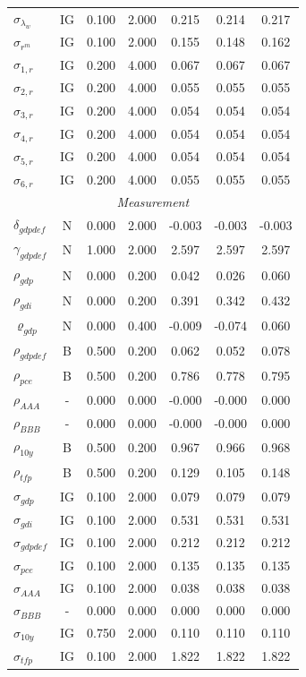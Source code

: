 \documentclass[12pt]{article}
\begin{document}
{\begin{longtable}{lcccccc}
$\sigma_{\lambda_w}$ & IG &    0.100 &    2.000 &    0.215 &    0.214 &    0.217 \\
$\sigma_{r^m}$ & IG &    0.100 &    2.000 &    0.155 &    0.148 &    0.162 \\
$\sigma_{1,r}$ & IG &    0.200 &    4.000 &    0.067 &    0.067 &    0.067 \\
$\sigma_{2,r}$ & IG &    0.200 &    4.000 &    0.055 &    0.055 &    0.055 \\
$\sigma_{3,r}$ & IG &    0.200 &    4.000 &    0.054 &    0.054 &    0.054 \\
$\sigma_{4,r}$ & IG &    0.200 &    4.000 &    0.054 &    0.054 &    0.054 \\
$\sigma_{5,r}$ & IG &    0.200 &    4.000 &    0.054 &    0.054 &    0.054 \\
$\sigma_{6,r}$ & IG &    0.200 &    4.000 &    0.055 &    0.055 &    0.055 \\
\multicolumn{7}{c}{\textit{Measurement}} \\[3pt]
$\delta_{gdpdef}$ & N &    0.000 &    2.000 &   -0.003 &   -0.003 &   -0.003 \\
$\gamma_{gdpdef}$ & N &    1.000 &    2.000 &    2.597 &    2.597 &    2.597 \\
$\rho_{gdp}$ & N &    0.000 &    0.200 &    0.042 &    0.026 &    0.060 \\
$\rho_{gdi}$ & N &    0.000 &    0.200 &    0.391 &    0.342 &    0.432 \\
$\varrho_{gdp}$ & N &    0.000 &    0.400 &   -0.009 &   -0.074 &    0.060 \\
$\rho_{gdpdef}$ & B &    0.500 &    0.200 &    0.062 &    0.052 &    0.078 \\
$\rho_{pce}$ & B &    0.500 &    0.200 &    0.786 &    0.778 &    0.795 \\
$\rho_{AAA}$ & - &    0.000 &    0.000 &   -0.000 &   -0.000 &    0.000 \\
$\rho_{BBB}$ & - &    0.000 &    0.000 &   -0.000 &   -0.000 &    0.000 \\
$\rho_{10y}$ & B &    0.500 &    0.200 &    0.967 &    0.966 &    0.968 \\
$\rho_{tfp}$ & B &    0.500 &    0.200 &    0.129 &    0.105 &    0.148 \\
$\sigma_{gdp}$ & IG &    0.100 &    2.000 &    0.079 &    0.079 &    0.079 \\
$\sigma_{gdi}$ & IG &    0.100 &    2.000 &    0.531 &    0.531 &    0.531 \\
$\sigma_{gdpdef}$ & IG &    0.100 &    2.000 &    0.212 &    0.212 &    0.212 \\
$\sigma_{pce}$ & IG &    0.100 &    2.000 &    0.135 &    0.135 &    0.135 \\
$\sigma_{AAA}$ & IG &    0.100 &    2.000 &    0.038 &    0.038 &    0.038 \\
$\sigma_{BBB}$ & - &    0.000 &    0.000 &    0.000 &    0.000 &    0.000 \\
$\sigma_{10y}$ & IG &    0.750 &    2.000 &    0.110 &    0.110 &    0.110 \\
$\sigma_{tfp}$ & IG &    0.100 &    2.000 &    1.822 &    1.822 &    1.822 \\
\end{longtable}}
\end{document}
